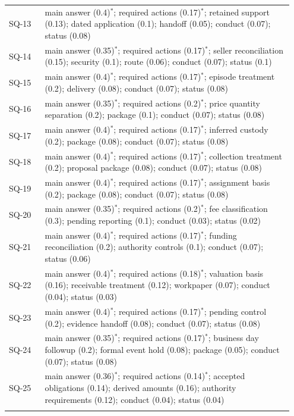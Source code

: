 {\begin{longtable}{@{}p{0.12\linewidth}p{0.83\linewidth}@{}}
SQ-13 & main answer (0.4)$^{*}$; required actions (0.17)$^{*}$; retained support (0.13); dated application (0.1); handoff (0.05); conduct (0.07); status (0.08)\\\addlinespace
SQ-14 & main answer (0.35)$^{*}$; required actions (0.17)$^{*}$; seller reconciliation (0.15); security (0.1); route (0.06); conduct (0.07); status (0.1)\\\addlinespace
SQ-15 & main answer (0.4)$^{*}$; required actions (0.17)$^{*}$; episode treatment (0.2); delivery (0.08); conduct (0.07); status (0.08)\\\addlinespace
SQ-16 & main answer (0.35)$^{*}$; required actions (0.2)$^{*}$; price quantity separation (0.2); package (0.1); conduct (0.07); status (0.08)\\\addlinespace
SQ-17 & main answer (0.4)$^{*}$; required actions (0.17)$^{*}$; inferred custody (0.2); package (0.08); conduct (0.07); status (0.08)\\\addlinespace
SQ-18 & main answer (0.4)$^{*}$; required actions (0.17)$^{*}$; collection treatment (0.2); proposal package (0.08); conduct (0.07); status (0.08)\\\addlinespace
SQ-19 & main answer (0.4)$^{*}$; required actions (0.17)$^{*}$; assignment basis (0.2); package (0.08); conduct (0.07); status (0.08)\\\addlinespace
SQ-20 & main answer (0.35)$^{*}$; required actions (0.2)$^{*}$; fee classification (0.3); pending reporting (0.1); conduct (0.03); status (0.02)\\\addlinespace
SQ-21 & main answer (0.4)$^{*}$; required actions (0.17)$^{*}$; funding reconciliation (0.2); authority controls (0.1); conduct (0.07); status (0.06)\\\addlinespace
SQ-22 & main answer (0.4)$^{*}$; required actions (0.18)$^{*}$; valuation basis (0.16); receivable treatment (0.12); workpaper (0.07); conduct (0.04); status (0.03)\\\addlinespace
SQ-23 & main answer (0.4)$^{*}$; required actions (0.17)$^{*}$; pending control (0.2); evidence handoff (0.08); conduct (0.07); status (0.08)\\\addlinespace
SQ-24 & main answer (0.35)$^{*}$; required actions (0.17)$^{*}$; business day followup (0.2); formal event hold (0.08); package (0.05); conduct (0.07); status (0.08)\\\addlinespace
SQ-25 & main answer (0.36)$^{*}$; required actions (0.14)$^{*}$; accepted obligations (0.14); derived amounts (0.16); authority requirements (0.12); conduct (0.04); status (0.04)\\\addlinespace
\bottomrule\end{longtable}
}

